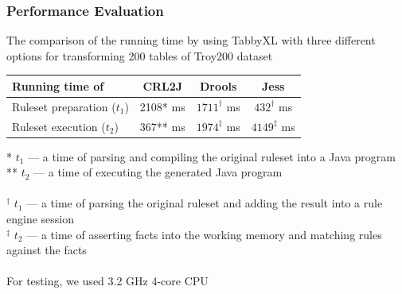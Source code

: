 \documentclass[10pt]{beamer}
\begin{document}
\begin{frame}
\frametitle{Performance Evaluation}
\small{The comparison of the running time by using TabbyXL with three different options for transforming 200 tables of Troy200 dataset %
}
\begin{table}
		\centering
		    \bgroup
        \def\arraystretch{1.5}
				\begin{tabular}{|l|c|c|c|}
						\hline
									Running time of             & CRL2J   & Drools  & Jess     \\
						\hline
									Ruleset preparation ($t_1$) & 2108* ms & $1711^\dagger$ ms & $432^\dagger$  ms \\
                  Ruleset execution ($t_2$)   & 367** ms & $1974^\ddagger$ ms & $4149^\ddagger$ ms \\
			      \hline
		    \end{tabular}
				\egroup
\end{table}
\scriptsize{
* $t_1$ --- a time of parsing and compiling the original ruleset into a Java program \\
** $t_2$ --- a time of executing the generated Java program
\\~\\
$^\dagger$ $t_1$ --- a time of parsing the original ruleset and adding the result into a rule engine session \\
$^\ddagger$ $t_2$ --- a time of asserting facts into the working memory and matching rules against the facts
\\~\\
For testing, we used 3.2 GHz 4-core CPU
}
\end{frame}

\end{document}
